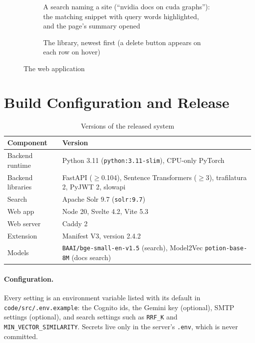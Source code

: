 \begin{figure}[H]
\centering
\begin{subfigure}[b]{\textwidth}
  \centering
  \caption{A search naming a site (``nvidia docs on cuda graphs''): the matching
  snippet with query words highlighted, and the page's summary opened}
\end{subfigure}

\vspace{4mm}
\begin{subfigure}[b]{\textwidth}
  \centering
  \caption{The library, newest first (a delete button appears on each row on hover)}
\end{subfigure}
\caption{The web application}
\label{fig:webapp}
\end{figure}

\section{Build Configuration and Release}

\begin{table}[H]
\centering
\footnotesize
\begin{tabularx}{\textwidth}{>{\raggedright\arraybackslash}p{} L}
\toprule
\textbf{Component} & \textbf{Version} \\
\midrule
Backend runtime & Python 3.11 (\texttt{python:3.11-slim}), CPU-only PyTorch \\
Backend libraries & FastAPI ($\geq$0.104), Sentence Transformers ($\geq$3), trafilatura 2, PyJWT 2, slowapi \\
Search & Apache Solr 9.7 (\texttt{solr:9.7}) \\
Web app & Node 20, Svelte 4.2, Vite 5.3 \\
Web server & Caddy 2 \\
Extension & Manifest V3, version 2.4.2 \\
Models & \texttt{BAAI/bge-small-en-v1.5} (search), Model2Vec \texttt{potion-base-8M} (docs search) \\
\bottomrule
\end{tabularx}
\caption{Versions of the released system}
\label{tab:versions}
\end{table}

\paragraph{Configuration.} Every setting is an environment variable listed
with its default in \texttt{code/src/.env.example}: the Cognito ids, the
Gemini key (optional), SMTP settings (optional), and search settings such as
\texttt{RRF\_K} and \texttt{MIN\_VECTOR\_SIMILARITY}. Secrets live only in the
server's \texttt{.env}, which is never committed.

